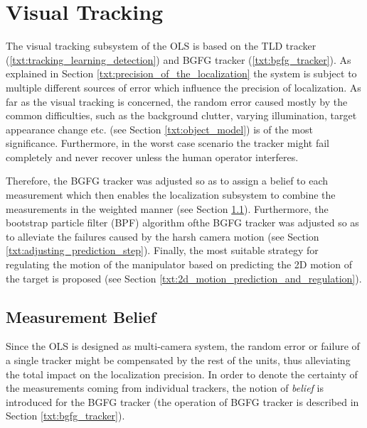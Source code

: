 \section{Visual Tracking} \label{txt:visual_tracking}

The visual tracking subsystem of the OLS is based on the TLD tracker (\ref{txt:tracking_learning_detection}) and BGFG tracker (\ref{txt:bgfg_tracker}). As explained in Section \ref{txt:precision_of_the_localization} the system is subject to multiple different sources of error which influence the precision of localization. As far as the visual tracking is concerned, the random error caused mostly by the common difficulties, such as the background clutter, varying illumination, target appearance change etc. (see Section \ref{txt:object_model}) is of the most significance. Furthermore, in the worst case scenario the tracker might fail completely and never recover unless the human operator interferes.

Therefore, the BGFG tracker was adjusted so as to assign a belief to each measurement which then enables the localization subsystem to combine the measurements in the weighted manner (see Section \ref{txt:measurement_belief}). Furthermore, the bootstrap particle filter (BPF) algorithm ofthe BGFG tracker was adjusted so as to alleviate the failures caused by the harsh camera motion (see Section \ref{txt:adjusting_prediction_step}). Finally, the most suitable strategy for regulating the motion of the manipulator based on predicting the 2D motion of the target is proposed (see Section \ref{txt:2d_motion_prediction_and_regulation}).

\subsection{Measurement Belief} \label{txt:measurement_belief}

Since the OLS is designed as multi-camera system, the random error or failure of a single tracker might be compensated by the rest of the units, thus alleviating the total impact on the localization precision. In order to denote the certainty of the measurements coming from individual trackers, the notion of \textit{belief} is introduced for the BGFG tracker (the operation of BGFG tracker is described in Section \ref{txt:bgfg_tracker}).

